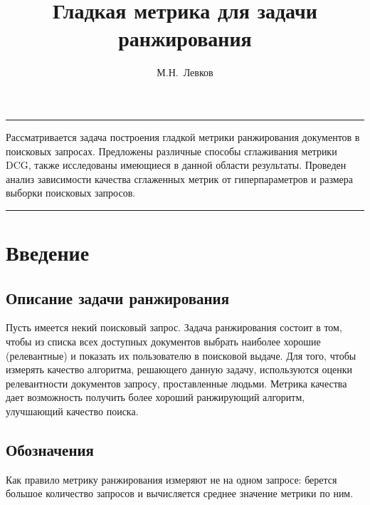 \documentclass[14pt,a4paper]{amsart}
\theoremstyle{definition}
\theoremstyle{definition}
\renewenvironment{abstract}{%
\hfill\begin{minipage}{0.95\textwidth}
\rule{\textwidth}{1pt}}
{\par\noindent\rule{\textwidth}{1pt}\end{minipage}}
\begin{document}

\title{Гладкая метрика для задачи ранжирования}

\author{М.Н.~Левков}

\maketitle

\begin{abstract}
\normalsize
Рассматривается задача построения гладкой метрики ранжирования документов в поисковых запросах. Предложены различные способы сглаживания метрики DCG, также исследованы имеющиеся в данной области результаты. Проведен анализ зависимости качества сглаженных метрик от гиперпараметров и размера выборки поисковых запросов.
\end{abstract}




\tableofcontents

\pagebreak


\section{Введение}

\subsection{Описание задачи ранжирования}
Пусть имеется некий поисковый запрос. Задача ранжирования состоит в том, чтобы из списка всех доступных документов выбрать наиболее хорошие (релевантные) и показать их пользователю в поисковой выдаче. Для того, чтобы измерять качество алгоритма, решающего данную задачу, используются оценки релевантности документов запросу, проставленные людьми. Метрика качества дает возможность получить более хороший ранжирующий алгоритм, улучшающий качество поиска.

\subsection{Обозначения}

Как правило метрику ранжирования измеряют не на одном запросе: берется большое количество запросов и вычисляется среднее значение метрики по ним. \\
\end{document}
